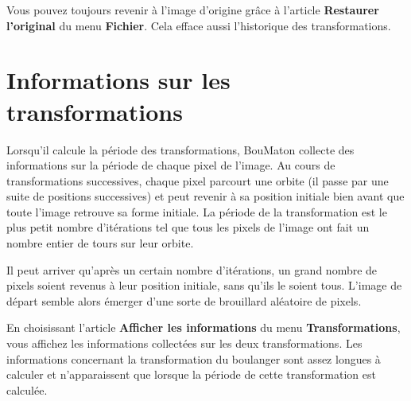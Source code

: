 \documentclass[a4paper]{article}
\newcommand{\BouMaton}{\textsf{BouMaton}\xspace}
\newcommand{\menu}[1]{\textsf{\textbf{#1}}}
\begin{document}
  Vous pouvez toujours revenir à l'image d'origine grâce à l'article 
  \menu{Restaurer l'original} du menu \menu{Fichier}. Cela efface 
  aussi l'historique des transformations.
  
  \section{Informations sur les transformations}
  Lorsqu'il calcule la période des transformations, \BouMaton collecte 
  des informations sur la période de chaque pixel de l'image. Au cours 
  de transformations successives, chaque pixel parcourt une orbite (il 
  passe par une suite de positions successives) et peut revenir à sa 
  position initiale bien avant que toute l'image retrouve sa forme 
  initiale. La période de la transformation est le plus petit nombre 
  d'itérations tel que tous les pixels de l'image ont fait un nombre 
  entier de tours sur leur orbite.
  
  Il peut arriver qu'après un certain nombre d'itérations, un grand 
  nombre de pixels soient revenus à leur position initiale, sans 
  qu'ils le soient tous. L'image de départ semble alors émerger d'une 
  sorte de brouillard aléatoire de pixels.

  En choisissant l'article \menu{Afficher les informations} du menu 
  \menu{Transformations}, vous affichez les informations collectées 
  sur les deux transformations. Les informations concernant la 
  transformation du boulanger sont assez longues à calculer et 
  n'apparaissent que lorsque la période de cette transformation est 
  calculée.
  
\end{document}
